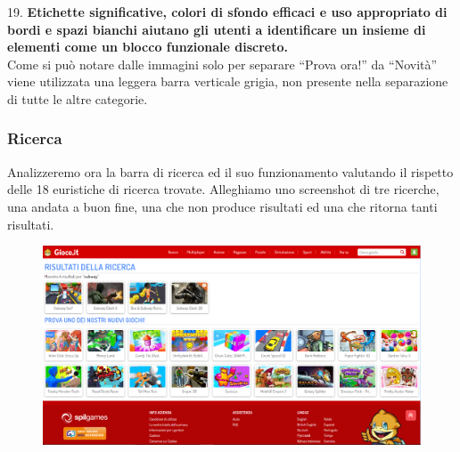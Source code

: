 \documentclass[../Report.tex]{subfiles}
\begin{document}
    19. \textbf{Etichette significative, colori di sfondo efficaci e uso appropriato di bordi e spazi bianchi aiutano gli utenti a identificare un insieme di elementi come un blocco funzionale discreto.}\\
	Come si può notare dalle immagini solo per separare “Prova ora!” da “Novità” viene utilizzata una leggera barra verticale grigia, non presente nella separazione di tutte le altre categorie.

    \subsubsection{Ricerca}
    Analizzeremo ora la barra di ricerca ed il suo funzionamento valutando il rispetto delle 18 euristiche di ricerca trovate. Alleghiamo uno screenshot di tre ricerche, una andata a buon fine, una che non produce risultati ed una che ritorna tanti risultati.

    \begin{figure}[H]
        \includegraphics[width=\linewidth]{Assestment3.png}
        \centering
    \end{figure}
\end{document}
